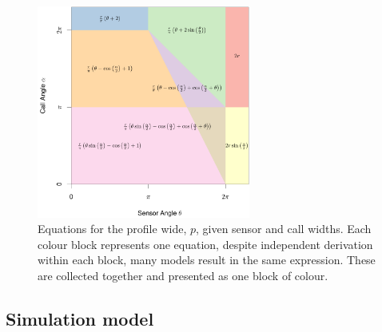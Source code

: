 \documentclass[a4paper,10pt,reqno,oneside]{amsart}
\begin{document}
\begin{figure}
	\centering
	\includegraphics[width=7cm]{imgs/equalModelResults.pdf}
	\caption{Equations for the profile wide, $p$, given sensor and call widths. Each colour block represents one equation, despite independent derivation within each block, many models result in the same expression. These are collected together and presented as one block of colour.}
	\label{f:equalModelResults}
\end{figure}



\subsection{Simulation model}
\end{document}
